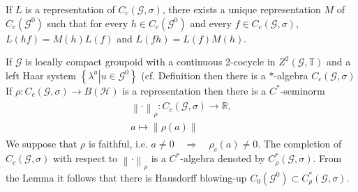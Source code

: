 \documentclass{beamer}
\theoremstyle{plain}
\newcommand{\G}{\mathcal{G}}
\newcommand{\T}{\mathbb{T}}
\newcommand{\la}{\lambda}
\renewcommand{\H}{\mathcal{H}}               %
\newcommand{\bean}{\begin{eqnarray*}}
\newcommand{\eean}{\end{eqnarray*}}
\begin{document}
\begin{frame}
	\begin{lemma}\label{groupoid_mult_repr_lem}
		If $L$ is a representation of $C_c\left(\G, \sigma\right)$, there exists a unique representation
		$M$ of $C_c\left(\G^0\right)$ such that for every $h \in C_c\left(\G^0\right)$ and every $f\in C_c\left(\G, \sigma\right)$, $L\left(h f \right)= M\left(h \right)L\left(f \right)$  and
		$L\left(fh \right)= L\left(f \right)M\left(h \right)$. 
	\end{lemma}
	
	If $\G$ is locally compact groupoid with a continuous 2-cocycle in $Z^2\left(\G, \T\right)$ and a left  Haar system $\left\{\la^u\left| u \in \G^0\right.\right\}$  (cf. Definition then there is a $*$-algebra $C_c\left(\G, \sigma \right)$
	If  $\rho: 	C_c\left(\G , \sigma \right)\to B\left(\H \right)$ is a representation then there is a $C^*$-seminorm 
	\bean
	\begin{split}
		\left\|\cdot  \right\|_\rho :   	C_c\left(\G , \sigma \right)\to \mathbb{R},\\
		a \mapsto \left\|\rho\left( a \right)  \right\|
	\end{split}
	\eean
	We suppose that $\rho$ is \alert{faithful}, i.e. $a \neq 0\quad \Rightarrow \quad \rho_c\left(a \right) \neq 0$. The completion of  $C_c\left(\G , \sigma \right)$ with respect to 	$\left\|\cdot  \right\|_\rho$ is a $C^*$-algebra denoted by $C^*_\rho\left(\G , \sigma \right)$. From the Lemma it follows that there is \alert{Hausdorff blowing-up} $C_0\left(\G^0 \right) \subset C^*_\rho\left(\G , \sigma \right)$.
\end{frame}
\
\end{document}
